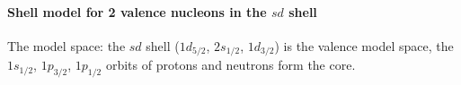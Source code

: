 \documentclass[11pt,a4paper]{article}
\begin{document}
\paragraph{Shell model for 2 valence nucleons in the \texorpdfstring{$sd$}{sd} shell}
The model space: the $sd$ shell ($1d_{5/2}$, $2s_{1/2}$, $1d_{3/2}$) is the valence model space, the $1s_{1/2}$, $1p_{3/2}$, $1p_{1/2}$ orbits of protons and neutrons form the core.
\end{document}
